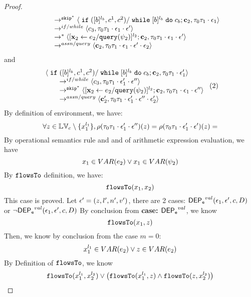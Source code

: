 \begin{proof}
\[\begin{array}{l}
  \qquad \rightarrow^{\mathtt{skip}^*} 
  \langle \;\mathtt{if}\; ([b]^{l_b}, c^1, c^2) / \;\mathtt{while}\; [b]^{l_b} \;\mathtt{do}\; c_b;{\boldsymbol{\mathbf{c}}}_2, 
  \mathtt{\tau}_0 \mathtt{\tau}_1 \cdot \mathtt{\epsilon}_1 \rangle 
  \\
  \qquad \rightarrow^{if / while} 
  \langle c_3, 
  \mathtt{\tau}_0 \mathtt{\tau}_1 \cdot \mathtt{\epsilon}_1 \cdot \mathtt{\epsilon}' \rangle 
  \\
  \qquad \rightarrow^{*} 
  \langle [\mathrel{ {\boldsymbol{\mathbf{x}}}_2 \leftarrow e_2 / {\tt query}(\psi_2) }]^{l_2};{\boldsymbol{\mathbf{c}}}_2, 
  \mathtt{\tau}_0 \mathtt{\tau}_1 \cdot \mathtt{\epsilon}_1 \cdot \mathtt{\epsilon}' \rangle 
  \\
  \qquad \rightarrow^{assn/query} 
  \langle {\boldsymbol{\mathbf{c}}}_2,  \mathtt{\tau}_0 \mathtt{\tau}_1 \cdot \mathtt{\epsilon}_1 \cdot \mathtt{\epsilon}' \cdot \mathtt{\epsilon}_2 \rangle 
\end{array}
 \]
 and 
  \[
  \begin{array}{l}   
  \langle \;\mathtt{if}\; ([b]^{l_b}, c^1, c^2) / \;\mathtt{while}\; [b]^{l_b} \;\mathtt{do}\; c_b;{\boldsymbol{\mathbf{c}}}_2, 
  \mathtt{\tau}_0 \mathtt{\tau}_1 \cdot \mathtt{\epsilon}_1' \rangle 
  \\
  \qquad \rightarrow^{if / while} 
  \langle c_3, 
  \mathtt{\tau}_0 \mathtt{\tau}_1 \cdot \mathtt{\epsilon}_1' \cdot \mathtt{\epsilon}'' \rangle 
  \\
  \qquad \rightarrow^{\mathtt{skip}^*} 
  \langle [\mathrel{ {\boldsymbol{\mathbf{x}}}_2 \leftarrow e_2 / {\tt query}(\psi_2) }]^{l_2};{\boldsymbol{\mathbf{c}}}_2, 
  \mathtt{\tau}_0 \mathtt{\tau}_1 \cdot \mathtt{\epsilon}_1\cdot \mathtt{\epsilon}'' \rangle 
  \\
  \qquad \rightarrow^{assn/query} 
  \langle {\boldsymbol{\mathbf{c}}}_2',  \mathtt{\tau}_0 \mathtt{\tau}_1 \cdot \mathtt{\epsilon}_1' \cdot \mathtt{\epsilon}'' \cdot \mathtt{\epsilon}_2' \rangle 
\end{array} ~(2)
 \]
%
By definition of environment, we have:
\[
  \forall z \in \mathbb{LV}_c \setminus \{x_1^{l_1}\} ,
  \rho(\mathtt{\tau}_0 \mathtt{\tau}_1 \cdot \mathtt{\epsilon}_1' \cdot \mathtt{\epsilon}'') (z) =  
  \rho(\mathtt{\tau}_0 \mathtt{\tau}_1 \cdot \mathtt{\epsilon}_1' \cdot \mathtt{\epsilon}') (z) = 
\]
By operational semantics rule  and  and  of arithmetic expression evaluation, we have 
\[
  x_1 \in VAR(e_2) \lor x_1 \in VAR(\psi_2)
\]
By $\mathtt{flowsTo}$ definition, we have:
\[
\mathtt{flowsTo}(x_1, x_2)
\]
This case is proved.
Let $\mathtt{\epsilon}' = (z, l', n', v')$, there are 2 cases:
$\mathsf{DEP_{\mathtt{e}}}^{val}(\mathtt{\epsilon}_1, \mathtt{\epsilon}', c, D)$ or $\neg \mathsf{DEP_{\mathtt{e}}}^{val}(\mathtt{\epsilon}_1, \mathtt{\epsilon}', c, D)$
%
%
By conclusion from \textbf{case: $\mathsf{DEP_{\mathtt{e}}}^{val}$}, we know
\[
  \mathtt{flowsTo}(x_1, z)
\]
Then, we know by conclusion from the case $m = 0$:
\[
  x_1^{l_1} \in VAR(e_2) \lor z \in VAR(e_2)
\]
%
By Definition of $\mathtt{flowsTo}$, we know
\[
  \mathtt{flowsTo}(x_1^{l_1}, x_2^{l_2}) \lor 
  \big(\mathtt{flowsTo}(x_1^{l_1}, z) \land \mathtt{flowsTo}(z, x_2^{l_2}) \big)
\]
\end{proof}
